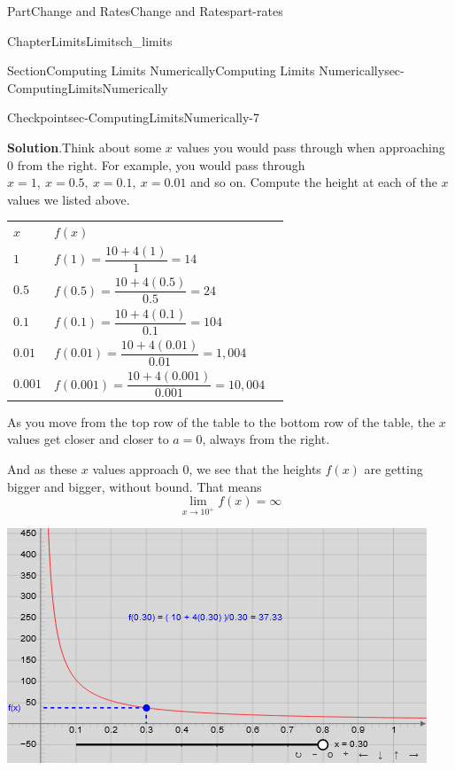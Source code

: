 \documentclass[oneside,10pt,]{tufte-book}
\newcommand{\blocktitlefont}{\relax}
\newcommand{\tabularfont}{\relax}
\numberwithin{equation}{chapter}
\newcommand{\hrulemedium}{\noalign{\hrule height 0.07em}}
\begin{document}
\begin{partptx}{Part}{Change and Rates}{}{Change and Rates}{}{}{part-rates}
\begin{chapterptx}{Chapter}{Limits}{}{Limits}{}{}{ch_limits}
\begin{sectionptx}{Section}{Computing Limits Numerically}{}{Computing Limits Numerically}{}{}{sec-ComputingLimitsNumerically}
\begin{inlineexercise}{Checkpoint}{}{sec-ComputingLimitsNumerically-7}
\par\smallskip%
\noindent\textbf{\blocktitlefont Solution}.\hypertarget{sec-ComputingLimitsNumerically-7-2}{}\quad{}Think about some \(x\) values you would pass through when approaching \(0\) from the right. For example, you would pass through \(x=1,\ x=0.5,\ x=0.1,\ x=0.01\) and so on. Compute the height at each of the \(x\) values we listed above. \begin{center}%
{\tabularfont%
\begin{tabular}{lBl}
\(x\)&\(f(x)\)\tabularnewline\hrulemedium
\(1\)&\(f(1) = \dfrac{10+4(1)}{1} = 14  \)\tabularnewline\hrulemedium
\(0.5\)&\(f(0.5) = \dfrac{10+4(0.5)}{0.5} = 24  \)\tabularnewline\hrulemedium
\(0.1\)&\(f(0.1) = \dfrac{10+4(0.1)}{0.1} = 104 \)\tabularnewline\hrulemedium
\(0.01\)&\(f(0.01) = \dfrac{10+4(0.01)}{0.01} = 1,004  \)\tabularnewline[0pt]
\(0.001\)&\(f(0.001) = \dfrac{10+4(0.001)}{0.001} = 10,004  \)
\end{tabular}
}%
\end{center}%
 As you move from the top row of the table to the bottom row of the table, the \(x\) values get closer and closer to \(a=0\), always from the right.%
\par
And as these \(x\) values approach 0, we see that the heights \(f(x)\) are getting bigger and bigger, without bound.  That means%
\begin{equation*}
\lim_{x\rightarrow 10^+} f(x) = \infty
\end{equation*}
%
\begin{sidebyside}{2}{0.075}{0.075}{0.17}%
\begin{sbspanel}{0.47}%
\includegraphics[width=\linewidth]{external/jsxgraph-inflimit.png}
\end{sbspanel}%
\begin{sbspanel}{0.21}%

\end{sbspanel}
\end{sidebyside}
\end{inlineexercise}
\end{sectionptx}
\end{chapterptx}
\end{partptx}
\end{document}
